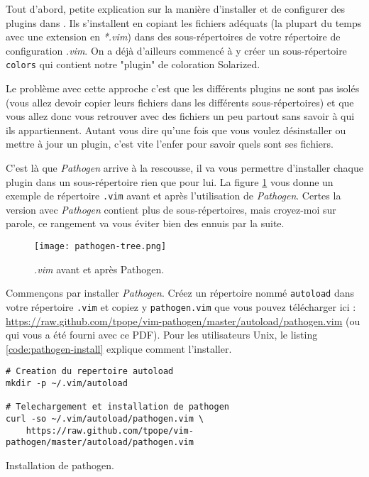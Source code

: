 Tout d'abord, petite explication sur la manière d'installer et de configurer des plugins dans \vim. Ils s'installent en copiant les fichiers adéquats (la plupart du temps avec une extension en \emph{*.vim}) dans des sous-répertoires de votre répertoire de configuration \emph{.vim}. On a déjà d'ailleurs commencé à y créer un sous-répertoire \Verb|colors| qui contient notre "plugin" de coloration Solarized.

Le problème avec cette approche c'est que les différents plugins ne sont pas isolés (vous allez devoir copier leurs fichiers dans les différents sous-répertoires) et que vous allez donc vous retrouver avec des fichiers un peu partout sans savoir à qui ils appartiennent. Autant vous dire qu'une fois que vous voulez désinstaller ou mettre à jour un plugin, c'est vite l'enfer pour savoir quels sont ses fichiers.

C'est là que \emph{Pathogen} arrive à la rescousse, il va vous permettre d'installer chaque plugin dans un sous-répertoire rien que pour lui. La figure \ref{fig:pathogen-tree} vous donne un exemple de répertoire \Verb|.vim| avant et après l'utilisation de \emph{Pathogen}. Certes la version avec \emph{Pathogen} contient plus de sous-répertoires, mais croyez-moi sur parole, ce rangement va vous éviter bien des ennuis par la suite.

\begin{figure}%
  \texttt{[image: pathogen-tree.png]}
  \caption{\emph{.vim} avant et après Pathogen.}
  \label{fig:pathogen-tree}
\end{figure}

Commençons par installer \emph{Pathogen}. Créez un répertoire nommé \Verb|autoload| dans votre répertoire \Verb|.vim| et copiez y \Verb|pathogen.vim| que vous pouvez télécharger ici : \url{https://raw.github.com/tpope/vim-pathogen/master/autoload/pathogen.vim} (ou qui vous a été fourni avec ce PDF). Pour les utilisateurs Unix, le listing \ref{code:pathogen-install} explique comment l'installer.

\begin{listing}[H]
\begin{verbatim}
# Creation du repertoire autoload
mkdir -p ~/.vim/autoload 

# Telechargement et installation de pathogen
curl -so ~/.vim/autoload/pathogen.vim \
    https://raw.github.com/tpope/vim-pathogen/master/autoload/pathogen.vim
\end{verbatim}
  \caption{Installation de pathogen.}
  \label{code:pathogen-install}
\end{listing}

